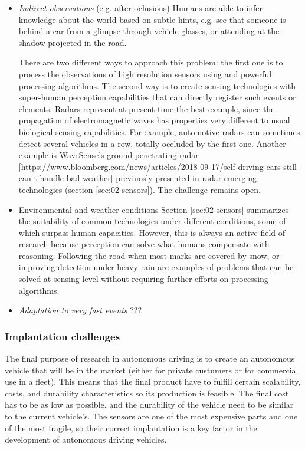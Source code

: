 \begin{itemize}
    \item \emph{Indirect observations} (e.g. after oclusions)
        Humans are able to infer knowledge about the world based on subtle 
        hints, e.g. see that someone is behind a car from a glimpse through
        vehicle glasses, or attending at the shadow projected in the road. 
        
        There are two different ways to approach this problem:
        the first one is to process the observations of high resolution sensors 
        using and powerful processing algorithms. 
        The second way is to create 
        sensing technologies with super-human perception capabilities that can 
        directly register such events or elements. 
        Radars represent at present time the best example, since the propagation
        of electromagnetic waves has properties very different to usual 
        biological sensing capabilities. For example, automotive radars can 
        sometimes detect several vehicles in a row, totally occluded by the 
        first one. Another example is WaveSense's ground-penetrating radar 
        \ref{https://www.bloomberg.com/news/articles/2018-09-17/self-driving-cars-still-can-t-handle-bad-weather}
        previuosly presented in radar emerging technologies (section 
        \ref{sec:02-sensors}). The challenge remains open.
    
    \item {Environmental and weather conditions}    
        Section \ref{sec:02-sensors} summarizes the suitability of common 
        technologies under different conditions, some of which surpass human 
        capacities. 
        However, this is always an active field of research because perception 
        can solve what humans compensate with reasoning. Following the road 
        when most marks are covered by snow, or improving detection under heavy 
        rain are examples of problems that can be solved at sensing level
        without requiring further efforts on processing algorithms.
    
    \item \emph{Adaptation to very fast events} ???
    
\end{itemize}


\subsubsection{Implantation challenges}

The final purpose of research in autonomous driving is to create an autonomous vehicle that will be in the market (either for private custumers or for commercial use in a fleet). This means that the final product have to fulfill certain scalability, costs, and durability characteristics so its production is feasible. The final cost has to be as low as possible, and the durability of the vehicle need to be similar to the current vehicle's. The sensors are one of the most expensive parts and one of the most fragile, so their correct implantation is a key factor in the development of autonomous driving vehicles.


